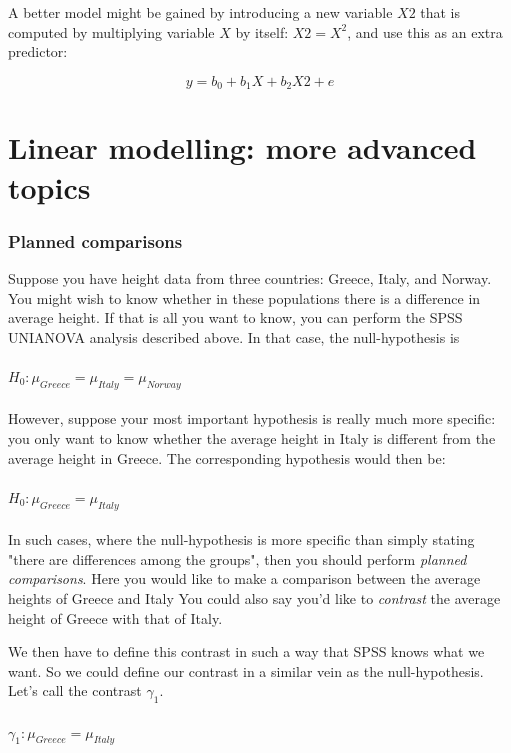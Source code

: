 \documentclass[]{report}\usepackage[]{graphicx}\usepackage[]{color}
\begin{document}
A better model might be gained by introducing a new variable $X2$ that is computed by multiplying variable $X$ by itself: $X2=X^2$, and use this as an extra predictor:

\begin{equation}
y = b_0 + b_1 X + b_2 X2 + e 
\end{equation}





\chapter{Linear modelling: more advanced topics}


\subsection{Planned comparisons}

Suppose you have height data from three countries: Greece, Italy, and Norway. You might wish to know whether in these populations there is a difference in average height. If that is all you want to know, you can perform the SPSS UNIANOVA analysis described above. In that case, the null-hypothesis is
\\
\\
$H_0: \mu_{Greece}=\mu_{Italy}=\mu_{Norway}$
\\
\\
However, suppose your most important hypothesis is really much more specific: you only want to know whether the average height in Italy is different from the average height in Greece. The corresponding hypothesis would then be: 
\\
\\
$H_0: \mu_{Greece}=\mu_{Italy}$
\\
\\
In such cases, where the null-hypothesis is more specific than simply stating "there are differences among the groups", then you should perform \textit{planned comparisons}. Here you would like to make a comparison between the average heights of Greece and Italy You could also say you'd like to \textit{contrast} the average height of Greece with that of Italy. 

We then have to define this contrast in such a way that SPSS knows what we want. So we could define our contrast in a similar vein as the null-hypothesis. Let's call the contrast $\gamma_1$.
\\
\\
$\gamma_1: \mu_{Greece}=\mu_{Italy}$
\\
\\
\end{document}

